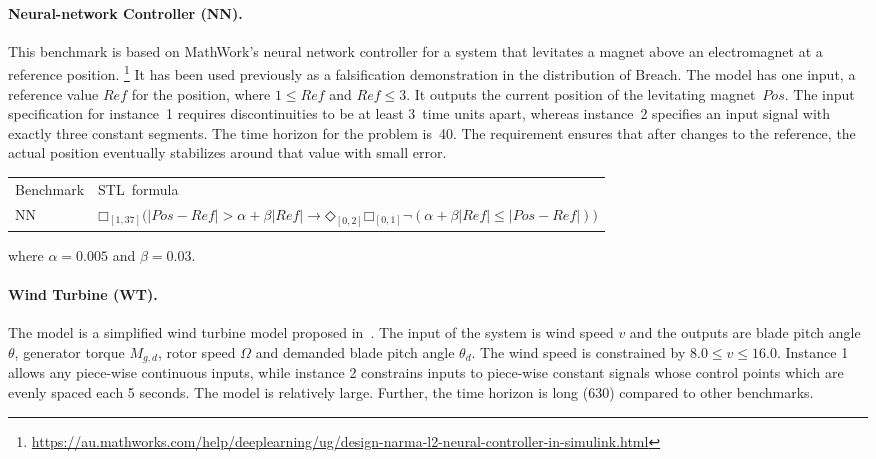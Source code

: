 \documentclass[a4paper]{easychair}
\newcommand{\falsify}{falsify\xspace}
\begin{document}
	\paragraph{Neural-network Controller (NN).}

	This benchmark is based on MathWork's neural network controller for a system that levitates a magnet above an electromagnet at a reference position.%
	\footnote{\url{https://au.mathworks.com/help/deeplearning/ug/design-narma-l2-neural-controller-in-simulink.html}}
	It has been used previously as a falsification demonstration in the distribution of Breach.
	The model has one input, a reference value $\mathit{Ref}$ for the position, where $1 \le \mathit{Ref}$ and $\mathit{Ref} \le 3$.
	It outputs the current position of the levitating magnet~$\mathit{Pos}$.
	The input specification for instance~1 requires discontinuities to be at least 3~time units apart,
	whereas instance~2 specifies an input signal with exactly three constant segments.
	The time horizon for the problem is~40.
	The requirement ensures that after changes to the reference, the actual position eventually stabilizes around that value with small error.

\noindent\begin{tabular}{ll}
	\toprule
	Benchmark & STL~formula \\
	\cmidrule(r){1-1} \cmidrule(l){2-2}
	NN & $□_{[1, 37]} \big(|Pos - Ref| > \alpha + \beta |Ref| \to ◇_{[0, 2]} □_{[0, 1]} \lnot (\alpha + \beta |Ref| \le |Pos - Ref|)\big)$ \\
	\bottomrule
\end{tabular}

\noindent where $\alpha=0.005$ and $\beta=0.03$.


	\paragraph{Wind Turbine (WT).}

	The model is a simplified wind turbine model proposed
    in~\cite{ARCH16:Hybrid_Modelling_of_Wind}.  The input of the
    system is wind speed $v$ and the outputs are blade pitch angle
    $\theta$, generator torque $M_{g, d}$, rotor speed $\Omega$ and
    demanded blade pitch angle $\theta_d$.  The wind speed is
    constrained by $8.0 \leq v \leq 16.0$.  Instance 1 allows any
    piece-wise continuous inputs, while instance 2 constrains inputs
    to piece-wise constant signals whose control points which are
    evenly spaced each 5 seconds.  The model is relatively large.
    Further, the time horizon is long (630) compared to other
    benchmarks.
\end{document}
